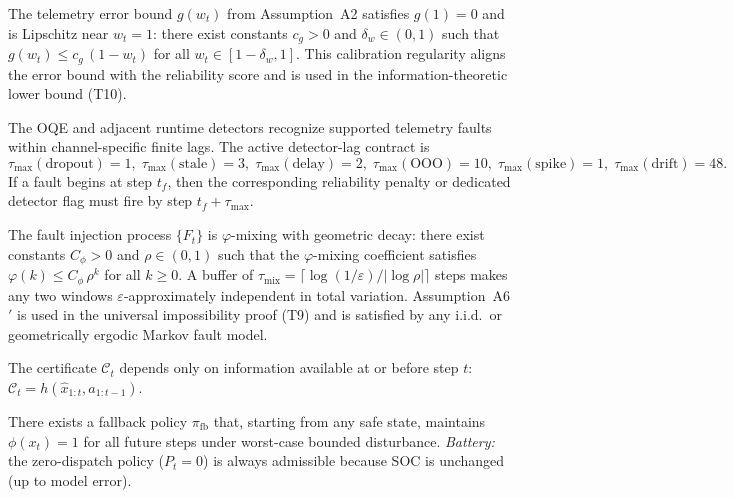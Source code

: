 \begin{assumption}
\label{assm:A5prime}
The telemetry error bound $g(w_t)$ from Assumption~A2 satisfies
$g(1) = 0$ and is Lipschitz near $w_t = 1$: there exist constants
$c_g > 0$ and $\delta_w \in (0,1)$ such that
$g(w_t) \le c_g\,(1-w_t)$ for all $w_t \in [1-\delta_w, 1]$.
This calibration regularity aligns the error bound with the reliability
score and is used in the information-theoretic lower bound (T10).
\end{assumption}

\begin{assumption}
\label{assm:A6}
The OQE and adjacent runtime detectors recognize supported telemetry faults
within channel-specific finite lags.  The active detector-lag contract is
\[
  \tau_{\max}(\text{dropout}) = 1,\;
  \tau_{\max}(\text{stale}) = 3,\;
  \tau_{\max}(\text{delay}) = 2,\;
  \tau_{\max}(\text{OOO}) = 10,\;
  \tau_{\max}(\text{spike}) = 1,\;
  \tau_{\max}(\text{drift}) = 48.
\]
If a fault begins at step $t_f$, then the corresponding reliability penalty
or dedicated detector flag must fire by step $t_f + \tau_{\max}$.
\end{assumption}

\begin{assumption}
\label{assm:A6prime}
The fault injection process $\{F_t\}$ is $\varphi$-mixing with
geometric decay: there exist constants $C_\phi > 0$ and $\rho\in(0,1)$
such that the $\varphi$-mixing coefficient satisfies $\varphi(k) \le
C_\phi\,\rho^k$ for all $k \ge 0$.  A buffer of
$\tau_{\mathrm{mix}} = \lceil\log(1/\varepsilon)/|\log\rho|\rceil$
steps makes any two windows $\varepsilon$-approximately independent in
total variation.  Assumption~A6$'$ is used in the universal
impossibility proof (T9) and is satisfied by any i.i.d.\ or
geometrically ergodic Markov fault model.
\end{assumption}

\begin{assumption}
\label{assm:A7}
The certificate $\mathcal{C}_t$ depends only on information available
at or before step $t$: $\mathcal{C}_t = h(\hat{x}_{1:t}, a_{1:t-1})$.
\end{assumption}

\begin{assumption}
\label{assm:A8}
There exists a fallback policy $\pi_{\text{fb}}$ that, starting from any
safe state, maintains $\phi(x_t) = 1$ for all future steps under worst-case
bounded disturbance.
\emph{Battery:} the zero-dispatch policy ($P_t = 0$) is always admissible
because SOC is unchanged (up to model error).
\end{assumption}

